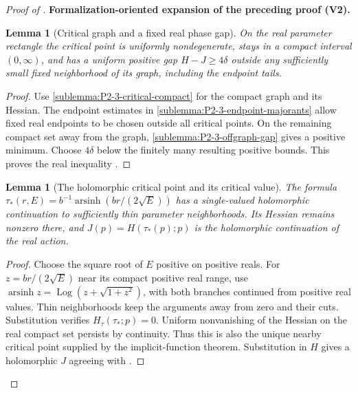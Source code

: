\documentclass[11pt]{article}
\newtheorem{lemma}[theorem]{Lemma}
\newcommand{\formalisationparentid}{X}
\newenvironment{formalisationaddition}[1]{\par\medskip\begingroup\color{blue}\def\formalisationparentid{#1}\setcounter{formalizationsublemma}{0}\let\lemma\formalizationsublemma\let\endlemma\endformalizationsublemma
  \def\Eo{\mathcal E_h^\circ}\def\EE{\mathcal E_h}\def\phio{\phi_h^\circ}\def\phih{\phi_h}\def\Ho{H_h^{\rm atom}(v^\circ)}\def\Ha{H_h^{\rm atom}}\def\HL{H_h^{L}}\def\Dh{D_h}\def\Log{\operatorname{Log}}\def\ellh{\ell_h}\def\Gp{G_{p,h}}\def\Ast{A_{*,h}}\def\ahat{\widehat{\mathfrak a}_h}\def\ah{\mathfrak a_h}\def\rh{\widehat\rho_h}\def\deltah{\widehat\delta_h}\def\oldref##1{\textup{(##1)}}\def\interface##1{\par\noindent\textit{Analytical interface used here.} ##1\par}\def\finish{\par\noindent\textit{Conclusion of the formalization-oriented expansion.} }\par\noindent\textbf{Formalization-oriented expansion of the preceding proof (V2).}\par\smallskip
}{\par\endgroup\medskip
}
\begin{document}
\begin{proof}[Proof of ]
\begin{formalisationaddition}{C-T6.1}
\begin{lemma}[Critical graph and a fixed real phase gap]\label{sublemma:C6-1-critical-gap}
On the real parameter rectangle the critical point is uniformly
nondegenerate, stays in a compact interval $(0,\infty)$, and has a
uniform positive gap $H-J\ge4\delta$ outside any sufficiently small
fixed neighborhood of its graph, including the endpoint tails.
\end{lemma}
\begin{proof}
Use \ref{sublemma:P2-3-critical-compact} for the compact graph and its
Hessian. The endpoint estimates in
\ref{sublemma:P2-3-endpoint-majorants} allow fixed real endpoints to be
chosen outside all critical points. On the remaining compact set away
from the graph, \ref{sublemma:P2-3-offgraph-gap} gives a positive
minimum. Choose $4\delta$ below the finitely many resulting positive
bounds. This proves the real inequality .
\end{proof}

\begin{lemma}[The holomorphic critical point and its critical value]\label{sublemma:C6-1-critical-holomorphic}
The formula
$\tau_*(r,E)=b^{-1}\operatorname{arsinh}(br/(2\sqrt E))$
has a single-valued holomorphic continuation to sufficiently thin
parameter neighborhoods. Its Hessian remains nonzero there, and
$J(p)=H(\tau_*(p);p)$ is the holomorphic continuation of the real action.
\end{lemma}
\begin{proof}
Choose the square root of $E$ positive on positive reals. For
$z=br/(2\sqrt E)$ near its compact positive real range, use
$\operatorname{arsinh}z=\Log(z+\sqrt{1+z^2})$, with both branches
continued from positive real values. Thin neighborhoods keep the
arguments away from zero and their cuts. Substitution verifies
$H_\tau(\tau_*;p)=0$. Uniform nonvanishing of the Hessian on the real
compact set persists by continuity. Thus this is also the unique nearby
critical point supplied by the implicit-function theorem. Substitution
in $H$ gives a holomorphic $J$ agreeing with .
\end{proof}


\end{formalisationaddition}
\end{proof}
\end{document}
